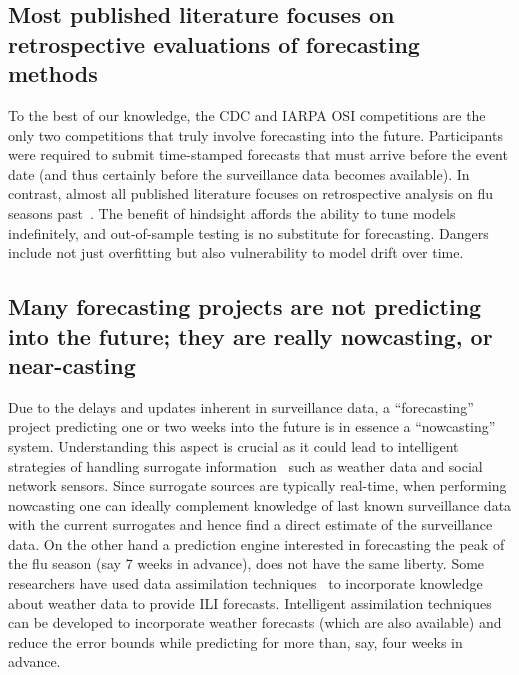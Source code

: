 \documentclass[10pt,letterpaper]{article}
\begin{document}
\subsection*{Most published literature focuses on retrospective evaluations of forecasting methods}
To the best of our knowledge, the CDC and IARPA OSI competitions are the only
two competitions that truly involve forecasting into the future. Participants
were required to submit time-stamped forecasts that must arrive before the
event date (and thus certainly before the surveillance data becomes available).
In contrast, almost all published literature focuses on retrospective analysis
on flu seasons past~\cite{hall2007}.
The benefit of hindsight affords the ability to tune
models indefinitely, and out-of-sample testing is no substitute for
forecasting. Dangers include not just overfitting but also vulnerability to
model drift over time.

\subsection*{Many forecasting projects are not predicting into the future; they are really nowcasting, or near-casting}
Due to the delays and updates inherent in surveillance data, a ``forecasting''
project predicting one or two weeks into the future is in essence a
``nowcasting''~\cite{lampos2012nowcasting} system.  Understanding this aspect
is crucial as it could lead to intelligent strategies of handling surrogate
information~\cite{Preis140095} such as weather data and social network sensors.
Since surrogate sources are typically real-time, when performing nowcasting one
can ideally complement knowledge of last known surveillance data with the
current surrogates and hence find a direct estimate of the surveillance data.
On the other hand a prediction engine interested in forecasting the peak of the
flu season (say 7 weeks in advance), does not have the same liberty. Some
researchers have used data assimilation
techniques~\cite{lampos2012nowcasting,ronni2015empbayes} to incorporate
knowledge about weather data to provide ILI forecasts. Intelligent assimilation
techniques can be developed to incorporate weather forecasts (which are also
available) and reduce the error bounds while predicting for more than, say,
four weeks in advance. 
\end{document}

